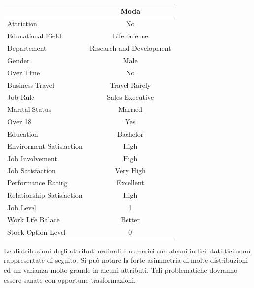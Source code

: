\documentclass[a4paper,9pt]{article}
\begin{document}
\begin{center}
\begin{tabular}{lc}
\toprule
 &\bfseries Moda \\
\hline
\hline
\rowcolor[gray]{0.9}
Attriction & No\\
Educational Field & Life Science\\
\rowcolor[gray]{0.9}
Departement & Research and Development\\
Gender & Male\\
\rowcolor[gray]{0.9}
Over Time & No\\
Business Travel & Travel Rarely\\
\rowcolor[gray]{0.9}
Job Rule & Sales Executive\\
Marital Status & Married \\
\rowcolor[gray]{0.9}
Over 18 & Yes\\ 
Education & Bachelor\\
\rowcolor[gray]{0.9}
Envirorment Satisfaction & High\\
Job Involvement & High\\
\rowcolor[gray]{0.9}
Job Satisfaction & Very High\\
Performance Rating & Excellent\\
\rowcolor[gray]{0.9}
Relationship Satisfaction & High\\
Job Level & 1\\
\rowcolor[gray]{0.9}
Work Life Balace & Better\\
Stock Option Level & 0\\
\bottomrule 
\end{tabular}
\end{center}
 
Le distribuzioni degli attributi ordinali e numerici con alcuni indici statistici sono rappresentate di seguito.
Si può notare la forte asimmetria di molte distribuzioni ed un varianza molto grande in alcuni attributi. Tali problematiche dovranno essere sanate con opportune trasformazioni.
\end{document}
